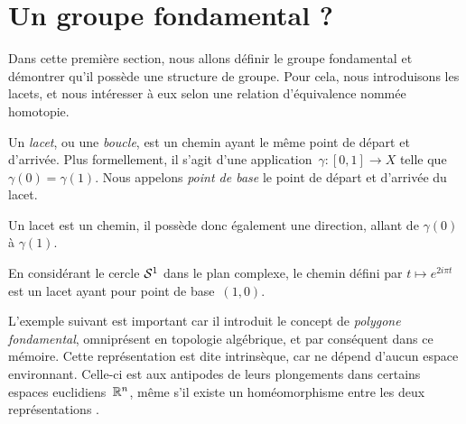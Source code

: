\section{Un groupe fondamental ?}

Dans cette première section, nous allons définir le groupe fondamental et démontrer qu'il possède une structure de groupe. Pour cela, nous introduisons les lacets, et nous intéresser à eux selon une relation d'équivalence nommée homotopie.

\begin{definition}\label{def:loops}
Un \emph{lacet}, ou une \emph{boucle}, est un chemin ayant le même point de départ et d'arrivée. Plus formellement, il s'agit d'une application~$\gamma:[0,1]\to X$ telle que~$\gamma(0)=\gamma(1)$. Nous appelons \emph{point de base} le point de départ et d'arrivée du lacet.
\end{definition}

Un lacet est un chemin, il possède donc également une direction, allant de $\gamma(0)$ à $\gamma(1)$.

\begin{exemple}
En considérant le cercle $\mathcal{S}^{1}$ dans le plan complexe, le chemin défini par $t\mapsto e^{2i\pi t}$ est un lacet ayant pour point de base~$(1,0)$.
\end{exemple}

L'exemple suivant est important car il introduit le concept de \emph{polygone fondamental}, omniprésent en topologie algébrique, et par conséquent dans ce mémoire. Cette représentation est dite intrinsèque, car ne dépend d'aucun espace environnant. Celle-ci est aux antipodes de leurs plongements dans certains espaces euclidiens~$\mathbb{R}^n$, même s'il existe un homéomorphisme entre les deux représentations \cite{Homeo-article}.

